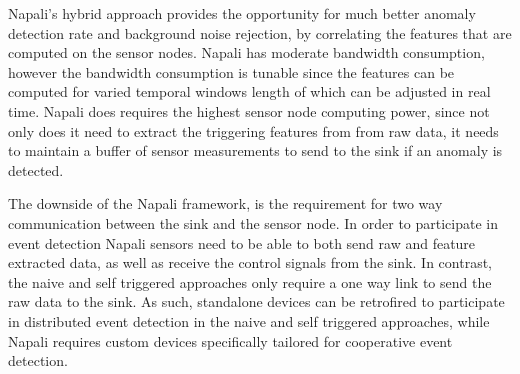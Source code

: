 Napali's hybrid approach provides the opportunity for much better anomaly detection rate and background noise rejection, by correlating the features that are computed on the sensor nodes.
Napali has moderate bandwidth consumption, however the bandwidth consumption is tunable since the features can be computed for varied temporal windows length of which can be adjusted in real time.
Napali does requires the highest sensor node computing power, since not only does it need to extract the triggering features from from raw data, it needs to maintain a buffer of sensor measurements to send to the sink if an anomaly is detected.

The downside of the Napali framework, is the requirement for two way communication between the sink and the sensor node.
In order to participate in event detection Napali sensors need to be able to both send raw and feature extracted data, as well as receive the control signals from the sink.
In contrast, the naive and self triggered approaches only require a one way link to send the raw data to the sink.
As such, standalone devices can be retrofired to participate in distributed event detection in the naive and self triggered approaches, while Napali requires custom devices specifically tailored for cooperative event detection.

